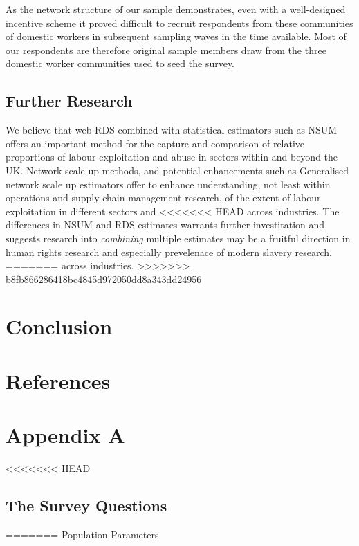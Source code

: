 \documentclass[
  12pt,
  letterpaper,
  DIV=11,
  numbers=noendperiod]{scrartcl}
\theoremstyle{plain}
\theoremstyle{definition}
\begin{document}
{As the network structure of our sample demonstrates, even with a
well-designed incentive scheme it proved difficult to recruit
respondents from these communities of domestic workers in subsequent
sampling waves in the time available. Most of our respondents are
therefore original sample members draw from the three domestic worker
communities used to seed the survey.

\subsection{Further Research}\label{further-research}

We believe that web-RDS combined with statistical estimators such as
NSUM offers an important method for the capture and comparison of
relative proportions of labour exploitation and abuse in sectors within
and beyond the UK. Network scale up methods, and potential enhancements
such as Generalised network scale up estimators offer to enhance
understanding, not least within operations and supply chain management
research, of the extent of labour exploitation in different sectors and
<<<<<<< HEAD
across industries. The differences in NSUM and RDS estimates warrants
further investitation and suggests research into \emph{combining}
multiple estimates may be a fruitful direction in human rights research
and especially prevelenace of modern slavery research.
=======
across industries.
>>>>>>> b8fb866286418bc4845d972050dd8a343dd24956

\section{Conclusion}\label{conclusion}

\newpage

\newpage

\section{References}\label{references}

\printbibliography[heading=none]

\newpage

\appendix

\section{Appendix A}\label{app-survey}

<<<<<<< HEAD
\subsection{The Survey Questions}\label{the-survey-questions}
=======
Population Parameters

}
\end{document}
